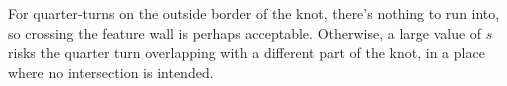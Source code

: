 \documentclass[openany]{book}
\begin{document}
For quarter-turns on the outside border of the knot, there's nothing to run into, so crossing the feature wall is perhaps acceptable. Otherwise, a large value of $s$ risks the quarter turn overlapping with a different part of the knot, in a place where no intersection is intended.
%
%
%
%
%
%
%
%
\end{document}
